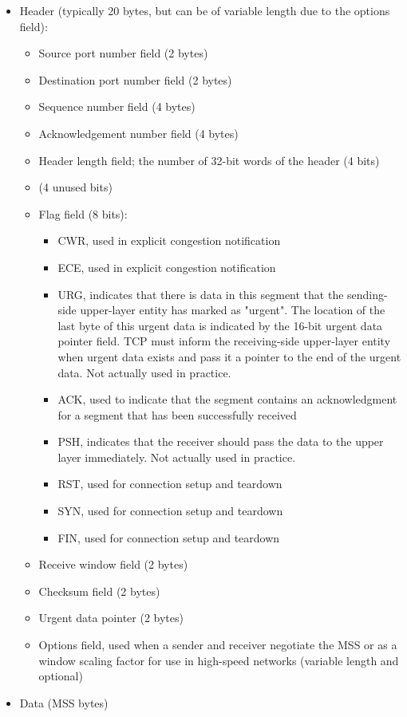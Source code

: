 \documentclass[table, xcdraw]{article}%
\begin{document}
\begin{itemize}
    \item Header (typically 20 bytes, but can be of variable length due to the options field):
    \begin{itemize}
        \item Source port number field (2 bytes)
        \item Destination port number field (2 bytes)
        \item Sequence number field (4 bytes)
        \item Acknowledgement number field (4 bytes)
        \item Header length field; the number of 32-bit words of the header (4 bits)
        \item (4 unused bits)
        \item Flag field (8 bits):
        \begin{itemize}
            \item CWR, used in explicit congestion notification
            \item ECE, used in explicit congestion notification
            \item URG, indicates that there is data in this segment that the sending-side upper-layer entity has marked as "urgent". The location of the last byte of this urgent data is indicated by the 16-bit urgent data pointer field. TCP must inform the receiving-side upper-layer entity when urgent data exists and pass it a pointer to the end of the urgent data. Not actually used in practice.
            \item ACK, used to indicate that the segment contains an acknowledgment for a segment that has been successfully received
            \item PSH, indicates that the receiver should pass the data to the upper layer immediately. Not actually used in practice.
            \item RST, used for connection setup and teardown
            \item SYN, used for connection setup and teardown
            \item FIN, used for connection setup and teardown
        \end{itemize}
        \item Receive window field (2 bytes)
        \item Checksum field (2 bytes)
        \item Urgent data pointer (2 bytes)
        \item Options field, used when a sender and receiver negotiate the MSS or as a window scaling factor for use in high-speed networks (variable length and optional)
    \end{itemize}
    \item Data (MSS bytes)
\end{itemize}
\end{document}
